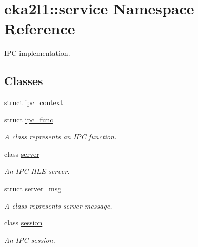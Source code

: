 \hypertarget{namespaceeka2l1_1_1service}{}\section{eka2l1\+:\+:service Namespace Reference}
\label{namespaceeka2l1_1_1service}


I\+PC implementation.  


\subsection*{Classes}
\begin{DoxyCompactItemize}
\item 
struct \mbox{\hyperlink{structeka2l1_1_1service_1_1ipc__context}{ipc\+\_\+context}}
\item 
struct \mbox{\hyperlink{structeka2l1_1_1service_1_1ipc__func}{ipc\+\_\+func}}
\begin{DoxyCompactList}\small\item\em A class represents an I\+PC function. \end{DoxyCompactList}\item 
class \mbox{\hyperlink{classeka2l1_1_1service_1_1server}{server}}
\begin{DoxyCompactList}\small\item\em An I\+PC H\+LE server. \end{DoxyCompactList}\item 
struct \mbox{\hyperlink{structeka2l1_1_1service_1_1server__msg}{server\+\_\+msg}}
\begin{DoxyCompactList}\small\item\em A class represents server message. \end{DoxyCompactList}\item 
class \mbox{\hyperlink{classeka2l1_1_1service_1_1session}{session}}
\begin{DoxyCompactList}\small\item\em An I\+PC session. \end{DoxyCompactList}\end{DoxyCompactItemize}
